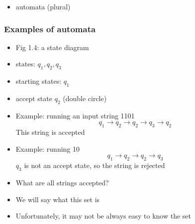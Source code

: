 \begin{frame}[allowframebreaks]
\begin{itemize}
\item [] automata (plural)

\end{itemize}\end{frame} \begin{frame}[allowframebreaks] \frametitle{Examples of automata}
  \begin{itemize}
  \item Fig 1.4: a state diagram


\item [] states: $q_1, q_2, q_3$

\item [] starting states: $q_1$

\item [] accept state $q_2$ (double circle)
\item Example: running an input string 1101
  \begin{equation*}
    q_1
\rightarrow q_2 \rightarrow
q_2 \rightarrow q_3 
\rightarrow q_2
\end{equation*}
This string is accepted
\item Example: running 10
    \begin{equation*}
    q_1
\rightarrow q_2 \rightarrow
q_2 \rightarrow q_3 
\end{equation*}
$q_3$ is not an accept state, so the string is rejected
\item What are all strings accepted?
\item [] We will say what this set is
\item [] Unfortunately, it may not be always easy to know the set

\end{itemize}\end{frame}


